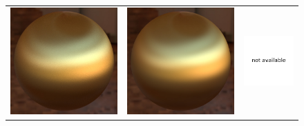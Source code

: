 \begin{figure}[t]
	\addtolength{\tabcolsep}{-3pt}
	\begin{tabular}{ccc}
	    \includegraphics[width=0.315\columnwidth]{images/validations/compare2/aniso_comb_hor_hor_512spp_17min.jpg} &
	    \includegraphics[width=0.315\columnwidth]{images/validations/compare2/aniso_comb_hor_hor_wenzel.jpg} &
	    \includegraphics[width=0.315\columnwidth]{images/validations/compare2/na.pdf} \\


\end{tabular}
\end{figure}
